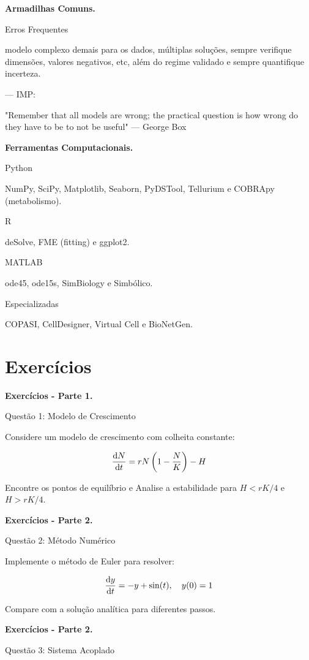 \textbf{Armadilhas Comuns.}

Erros Frequentes

modelo complexo demais para os dados, múltiplas soluções, sempre verifique dimensões, valores negativos, etc, além do regime validado e sempre quantifique incerteza.

--- IMP: 

"Remember that all models are wrong; the practical question is how wrong do they have to be to not be useful" --- George Box

\textbf{Ferramentas Computacionais.}

Python

NumPy, SciPy, Matplotlib, Seaborn, PyDSTool, Tellurium e COBRApy (metabolismo).

R

deSolve, FME (fitting) e ggplot2.

MATLAB

ode45, ode15s, SimBiology e Simbólico.

Especializadas

COPASI, CellDesigner, Virtual Cell e BioNetGen.

\section{Exercícios}

\textbf{Exercícios - Parte 1.}

Questão 1: Modelo de Crescimento

Considere um modelo de crescimento com colheita constante:

%
\begin{equation*}
\frac{\mathrm{d} N}{\mathrm{d} t} = rN\left(1 - \frac{N}{K}\right) - H
\end{equation*}
%

Encontre os pontos de equilíbrio e Analise a estabilidade para $H < rK/4$ e $H > rK/4$.

\textbf{Exercícios - Parte 2.}

Questão 2: Método Numérico

Implemente o método de Euler para resolver:

%
\begin{equation*}
\frac{\mathrm{d} y}{\mathrm{d} t} = -y + \sin(t), \quad y(0) = 1
\end{equation*}
%

Compare com a solução analítica para diferentes passos.

\textbf{Exercícios - Parte 2.}

Questão 3: Sistema Acoplado

